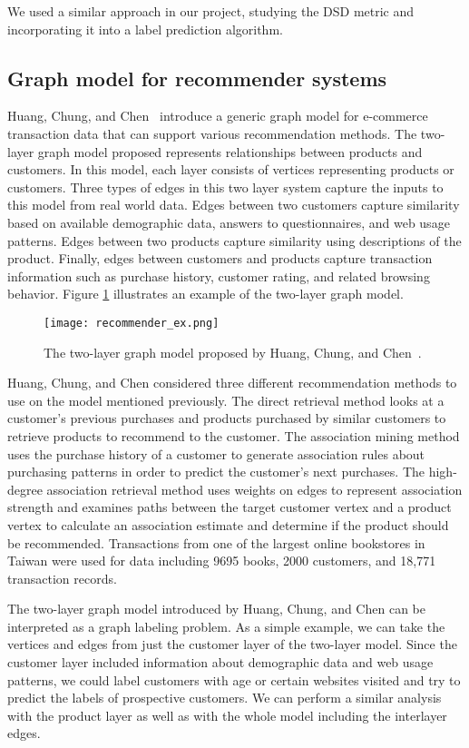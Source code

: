 We used a similar approach in our project, studying the DSD metric and
incorporating it into a label prediction algorithm.

\subsection{Graph model for recommender systems} Huang, Chung, and Chen~\cite{huang2004graph}
introduce a generic graph model for e-commerce transaction data that can support various
recommendation methods. The two-layer graph model proposed represents relationships between products
and customers. In this model, each layer consists of vertices representing products or customers.
Three types of edges in this two layer system capture the inputs to this model from real world data.
Edges between two customers capture similarity based on available demographic data, answers to
questionnaires, and web usage patterns. Edges between two products capture similarity using
descriptions of the product. Finally, edges between customers and products capture transaction
information such as purchase history, customer rating, and related browsing behavior. Figure
\ref{fig:recommender_example} illustrates an example of the two-layer graph model.

\begin{figure}[h] \centering \texttt{[image: recommender\_ex.png]}
\caption{The two-layer graph model proposed by Huang, Chung, and Chen~\cite{huang2004graph}.}
\label{fig:recommender_example}
\end{figure}

Huang, Chung, and Chen considered three different recommendation
methods to use on the model mentioned previously. The direct retrieval method looks at a customer's
previous purchases and products purchased by similar customers to retrieve products to recommend to
the customer. The association mining method uses the purchase history of a customer to generate
association rules about purchasing patterns in order to predict the customer's next purchases. The
high-degree association retrieval method uses weights on edges to represent association strength and
examines paths between the target customer vertex and a product vertex to calculate an association
estimate and determine if the product should be recommended. Transactions from one of the largest
online bookstores in Taiwan were used for data including 9695 books, 2000 customers, and 18,771
transaction records.

The two-layer graph model introduced by Huang, Chung,
and Chen can be interpreted as a graph labeling problem. As a simple example,
we can take the vertices and edges from just the customer layer of the two-layer model. Since the
customer layer included information about demographic data and web usage patterns, we could label
customers with age or certain websites visited and try to predict the labels of prospective
customers. We can perform a similar analysis with the product layer as well as with the whole model
including the interlayer edges.

